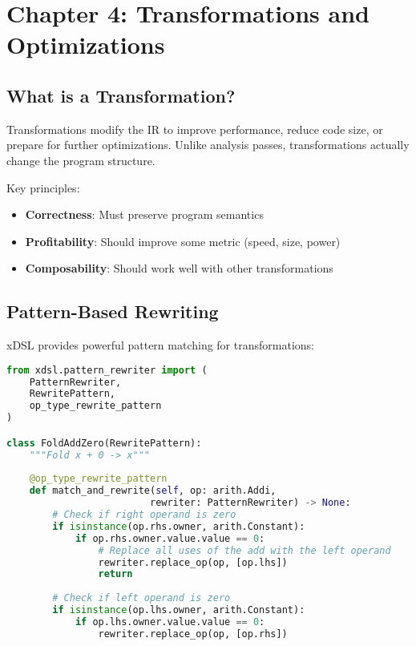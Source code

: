 \documentclass[11pt,a4paper]{article}
\begin{document}
\section{Chapter 4: Transformations and Optimizations}

\subsection{What is a Transformation?}

Transformations modify the IR to improve performance, reduce code size, or prepare for further optimizations. Unlike analysis passes, transformations actually change the program structure.

Key principles:
\begin{itemize}
    \item \textbf{Correctness}: Must preserve program semantics
    \item \textbf{Profitability}: Should improve some metric (speed, size, power)
    \item \textbf{Composability}: Should work well with other transformations
\end{itemize}

\subsection{Pattern-Based Rewriting}

xDSL provides powerful pattern matching for transformations:

\begin{lstlisting}[language=Python, caption=Simple Algebraic Optimization]
from xdsl.pattern_rewriter import (
    PatternRewriter, 
    RewritePattern,
    op_type_rewrite_pattern
)

class FoldAddZero(RewritePattern):
    """Fold x + 0 -> x"""
    
    @op_type_rewrite_pattern
    def match_and_rewrite(self, op: arith.Addi, 
                         rewriter: PatternRewriter) -> None:
        # Check if right operand is zero
        if isinstance(op.rhs.owner, arith.Constant):
            if op.rhs.owner.value.value == 0:
                # Replace all uses of the add with the left operand
                rewriter.replace_op(op, [op.lhs])
                return
        
        # Check if left operand is zero  
        if isinstance(op.lhs.owner, arith.Constant):
            if op.lhs.owner.value.value == 0:
                rewriter.replace_op(op, [op.rhs])
\end{lstlisting}
\end{document}
